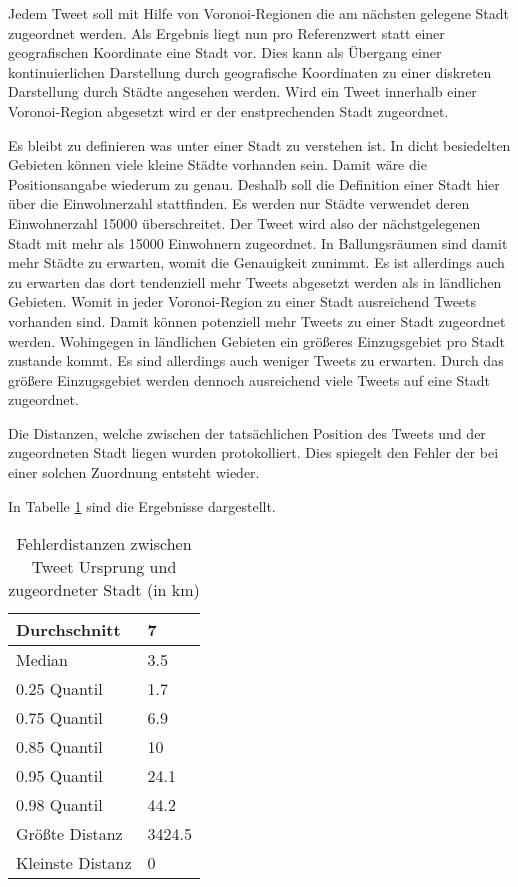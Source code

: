 					Jedem Tweet soll mit Hilfe von Voronoi-Regionen die am nächsten gelegene Stadt zugeordnet werden.
					Als Ergebnis liegt nun pro Referenzwert statt einer geografischen Koordinate eine Stadt vor.
					Dies kann als Übergang einer kontinuierlichen Darstellung durch geografische Koordinaten zu einer diskreten Darstellung durch Städte angesehen werden. 
					Wird ein Tweet innerhalb einer Voronoi-Region abgesetzt wird er der enstprechenden Stadt zugeordnet.

					Es bleibt zu definieren was unter einer Stadt zu verstehen ist.
					In dicht besiedelten Gebieten können viele kleine Städte vorhanden sein. 
					Damit wäre die Positionsangabe wiederum zu genau.
					Deshalb soll die Definition einer Stadt hier über die Einwohnerzahl stattfinden.
					Es werden nur Städte verwendet deren Einwohnerzahl 15000 überschreitet.
					Der Tweet wird also der nächstgelegenen Stadt mit mehr als 15000 Einwohnern zugeordnet.
					In Ballungsräumen sind damit mehr Städte zu erwarten, womit die Genauigkeit zunimmt.
					Es ist allerdings auch zu erwarten das dort tendenziell mehr Tweets abgesetzt werden als in ländlichen Gebieten.
					Womit in jeder Voronoi-Region zu einer Stadt ausreichend Tweets vorhanden sind.
					Damit können potenziell mehr Tweets zu einer Stadt zugeordnet werden.
					Wohingegen in ländlichen Gebieten ein größeres Einzugsgebiet pro Stadt zustande kommt.
					Es sind allerdings auch weniger Tweets zu erwarten. 
					Durch das größere Einzugsgebiet werden dennoch ausreichend viele Tweets auf eine Stadt zugeordnet. 

					Die Distanzen, welche zwischen der tatsächlichen Position des Tweets und der zugeordneten Stadt liegen wurden protokolliert. 
					Dies spiegelt den Fehler der bei einer solchen Zuordnung entsteht wieder.

					In Tabelle \ref{tab:distances} sind die Ergebnisse dargestellt.

					\begin{table}[h]
					\centering
					\caption{Fehlerdistanzen zwischen Tweet Ursprung und zugeordneter Stadt (in km)}
					\label{tab:distances}
					\begin{tabular}{|l|l|}
					Durchschnitt & 7      \\ \hline
					Median       & 3.5    \\ \hline
					0.25 Quantil & 1.7    \\ \hline
					0.75 Quantil & 6.9    \\ \hline
					0.85 Quantil & 10     \\ \hline
					0.95 Quantil & 24.1   \\ \hline
					0.98 Quantil & 44.2   \\ \hline
					Größte Distanz      & 3424.5 \\ \hline
					Kleinste Distanz     & 0     
					\end{tabular}
					\end{table}


